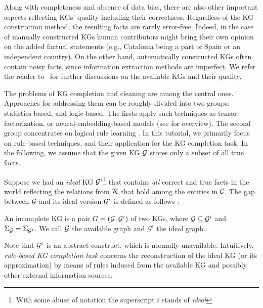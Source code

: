 Along with completeness and absence of data bias, there are also other important aspects reflecting KGs' quality %
including %
their correctness. Regardless of the KG construction method, the resulting facts are rarely error-free. Indeed, in the case of manually constructed KGs human contributors might bring their own opinion on the added factual statements (e.g., Catalonia being a part of Spain or an independent country). On the other hand, automatically constructed KGs often contain noisy facts, since information extraction methods are imperfect. We refer the reader to~\cite{Nickel2015ARO,DBLP:journals/semweb/Paulheim17} for further discussions on the available KGs and their quality.



The problems of KG completion and cleaning are %
among the central ones. Approaches for addressing them can be roughly divided into two groups: statistics-based, and logic-based. The firsts apply such techniques as tensor factorization, or neural-embedding-based models (see \cite{DBLP:journals/pieee/Nickel0TG16} for overview). The second group concentrates on logical rule learning \cite{ruleoverview}. In this tutorial, we primarily focus on rule-based techniques, and their application for the KG completion task. In the following, we assume that the given KG $\mathcal{G}$ stores only a subset of all true facts.

Suppose we had an \emph{ideal} KG $\mathcal{G}^i$\footnote{With some abuse of notation the superscript $i$ stands of \emph{ideal}} that contains \emph{all} correct and true facts in the world reflecting the relations from $\mathcal{R}$ that hold among the entities in $\mathcal{C}$. The gap between $\mathcal{G}$ and its ideal version $\mathcal{G}^i$ is defined as follows \cite{rdfcomp}: 

\begin{definition} An incomplete KG is a pair
    $G = (\mathcal{G}, \mathcal{G}^i)$ of two KGs, where $\mathcal{G}\subseteq \mathcal{G}^i$ and
    $\Sigma_{\mathcal{G}}=\Sigma_{\mathcal{G}^i}$. We call $\mathcal{G}$ the available
    graph and $\mathcal{G}^i$ the ideal graph.
\end{definition}
    
Note that $\mathcal{G}^i$ is an abstract construct, which is normally unavailable. Intuitively, \emph{rule-based KG completion task} concerns the reconstruction of the ideal KG (or its approximation) by means of rules induced from the available KG and possibly other external information sources.

